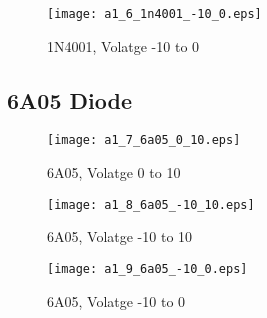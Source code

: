 \documentclass[10pt]{article}
\begin{document}
	\begin{figure}[hb!]
		\centering
		\texttt{[image: a1\_6\_1n4001\_-10\_0.eps]}
		\caption{1N4001, Volatge -10 to 0}
		\label{fig:1n3}
	\end{figure}
	\begin{framed}
	
	\end{framed}


\subsection{6A05 Diode}

	\begin{figure}[hb!]
		\centering
		\texttt{[image: a1\_7\_6a05\_0\_10.eps]}
		\caption{6A05, Volatge 0 to 10}
		\label{fig:6a1}
	\end{figure}
	\begin{framed}
	
	\end{framed}

	\begin{figure}[hb!]
		\centering
		\texttt{[image: a1\_8\_6a05\_-10\_10.eps]}
		\caption{6A05, Volatge -10 to 10}
		\label{fig:6a2}
	\end{figure}
	\begin{framed}
	
	\end{framed}

	\begin{figure}[hb!]
		\centering
		\texttt{[image: a1\_9\_6a05\_-10\_0.eps]}
		\caption{6A05, Volatge -10 to 0}
		\label{fig:6a3}
	\end{figure}
	\begin{framed}
	
	\end{framed}
\end{document}
